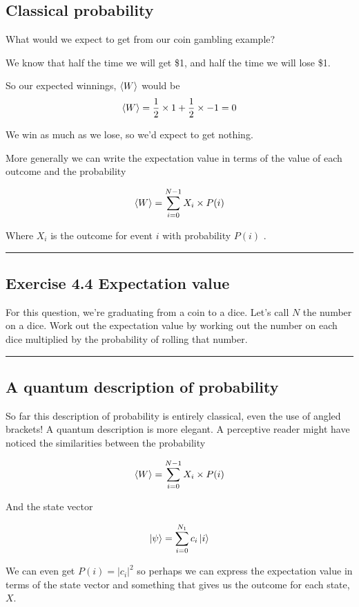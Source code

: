 \documentclass{book}
\begin{document}
\subsection{ Classical probability }

What would we expect to get from our coin gambling example? 

We know that half the time we will get \$1, and half the time we will lose \$1. 

So our expected winnings, $\braket{W}$ would be
$$
\braket{W} = \frac{1}{2} \times 1 + \frac{1}{2} \times -1 
=0
$$

We win as much as we lose, so we'd expect to get nothing. 

More generally we can write the expectation value in terms of the value of each outcome and the probability 

$$ \braket{W} = \sum_{i = 0}^{N-1} X_i \times P(i) $$

Where $X_i$ is the outcome for event $i$ with probability $P(i)$ . 

\hrule 
\subsection{Exercise 4.4 Expectation value}  
  
For this question, we're graduating from a coin to a dice. Let's call $N$ the number on a dice. Work out the expectation value by working out the number on each dice multiplied by the probability of rolling that number. \newline

\hrule

\subsection{ A quantum description of probability }

So far this description of probability is entirely classical, even the use of angled brackets! A quantum description is more elegant. A perceptive reader might have noticed the similarities between the probability

$$ \braket{W} = \sum_{i = 0}^{N-1} X_i \times P(i) $$

And the state vector

$$
\ket{\psi} = \sum_{i = 0}^{N_1} c_i \ket{i}
$$ 

We can even get $P(i) = |c_i|^2$ so perhaps we can express the expectation value in terms of the state vector and something that gives us the outcome for each state,$X$. 
\end{document}
